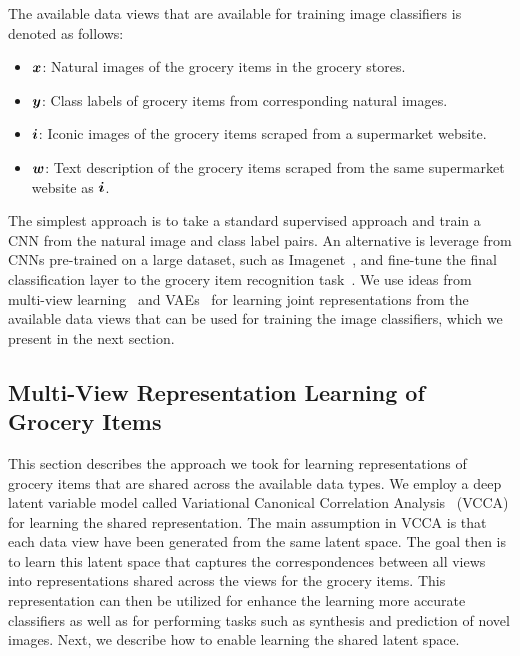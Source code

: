 The available data views that are available for training image classifiers is denoted as follows:
\begin{itemize}[itemsep=0em,topsep=1pt]
	\item ${\bm{x}}$: Natural images of the grocery items in the grocery stores.
	\item ${\bm{y}}$: Class labels of grocery items from corresponding natural images.
	\item ${\bm{i}}$: Iconic images of the grocery items scraped from a supermarket website.
	\item ${\bm{w}}$: Text description of the grocery items scraped from the same supermarket website as ${\bm{i}}$.
\end{itemize}
The simplest approach is to take a standard supervised approach and train a CNN from the natural image and class label pairs. An alternative is leverage from CNNs pre-trained on a large dataset, such as Imagenet~\cite{deng2009imagenet}, and fine-tune the final classification layer to the grocery item recognition task~\cite{sharif2014cnn}. We use ideas from multi-view learning~\cite{xu2013survey} and VAEs~\cite{kingma2013auto} for learning joint representations from the available data views that can be used for training the image classifiers, which we present in the next section.  


\subsection{Multi-View Representation Learning of Grocery Items}

This section describes the approach we took for learning representations of grocery items that are shared across the available data types. We employ a deep latent variable model called Variational Canonical Correlation Analysis~\cite{wang2016deep} (VCCA) for learning the shared representation. The main assumption in VCCA is that each data view have been generated from the same latent space. The goal then is to learn this latent space that captures the correspondences between all views into representations shared across the views for the grocery items. This representation can then be utilized for enhance the learning more accurate classifiers as well as for performing tasks such as synthesis and prediction of novel images. Next, we describe how to enable learning the shared latent space. 

